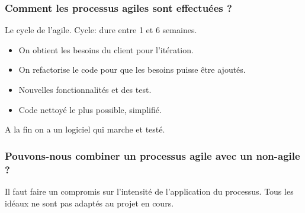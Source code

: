 \subsubsection{Comment les processus agiles sont effectuées ?}
Le cycle de l'agile. Cycle: dure entre 1 et 6 semaines.
\begin{itemize}
	\item On obtient les besoins du client pour l’itération.
	\item On refactorise le code pour que les besoins puisse être ajoutés.
	\item Nouvelles fonctionnalités et des test.
	\item Code nettoyé le plus possible, simplifié.
\end{itemize}
A la fin on a un logiciel qui marche et testé.
\subsubsection{Pouvons-nous combiner un processus agile avec un non-agile ?}
Il faut faire un compromis sur l’intensité de l’application du processus. Tous les idéaux ne sont pas adaptés au projet en cours.
